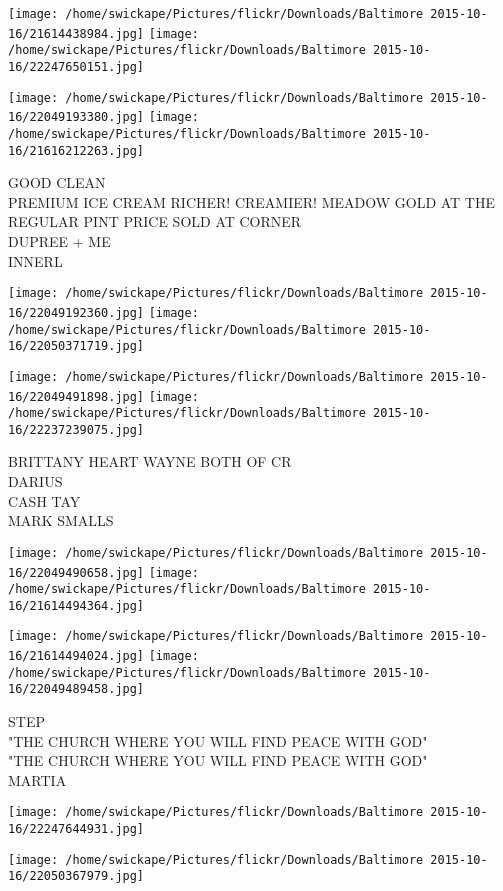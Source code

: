 \documentclass[10pt,letterpaper]{article}
\begin{document}
\texttt{[image: /home/swickape/Pictures/flickr/Downloads/Baltimore 2015-10-16/21614438984.jpg]}
\texttt{[image: /home/swickape/Pictures/flickr/Downloads/Baltimore 2015-10-16/22247650151.jpg]}

\texttt{[image: /home/swickape/Pictures/flickr/Downloads/Baltimore 2015-10-16/22049193380.jpg]}
\texttt{[image: /home/swickape/Pictures/flickr/Downloads/Baltimore 2015-10-16/21616212263.jpg]}

GOOD CLEAN\\
PREMIUM ICE CREAM RICHER! CREAMIER! MEADOW GOLD AT THE REGULAR PINT PRICE SOLD AT CORNER\\
DUPREE + ME\\
INNERL
\pagebreak

\texttt{[image: /home/swickape/Pictures/flickr/Downloads/Baltimore 2015-10-16/22049192360.jpg]}
\texttt{[image: /home/swickape/Pictures/flickr/Downloads/Baltimore 2015-10-16/22050371719.jpg]}

\texttt{[image: /home/swickape/Pictures/flickr/Downloads/Baltimore 2015-10-16/22049491898.jpg]}
\texttt{[image: /home/swickape/Pictures/flickr/Downloads/Baltimore 2015-10-16/22237239075.jpg]}

BRITTANY HEART WAYNE BOTH OF CR\\
DARIUS\\
CASH TAY\\
MARK SMALLS
\pagebreak

\texttt{[image: /home/swickape/Pictures/flickr/Downloads/Baltimore 2015-10-16/22049490658.jpg]}
\texttt{[image: /home/swickape/Pictures/flickr/Downloads/Baltimore 2015-10-16/21614494364.jpg]}

\texttt{[image: /home/swickape/Pictures/flickr/Downloads/Baltimore 2015-10-16/21614494024.jpg]}
\texttt{[image: /home/swickape/Pictures/flickr/Downloads/Baltimore 2015-10-16/22049489458.jpg]}

STEP\\
"THE CHURCH WHERE YOU WILL FIND PEACE WITH GOD"\\
"THE CHURCH WHERE YOU WILL FIND PEACE WITH GOD"\\
MARTIA
\pagebreak

\texttt{[image: /home/swickape/Pictures/flickr/Downloads/Baltimore 2015-10-16/22247644931.jpg]}

\vspace{0.25in}
\texttt{[image: /home/swickape/Pictures/flickr/Downloads/Baltimore 2015-10-16/22050367979.jpg]}
\end{document}
